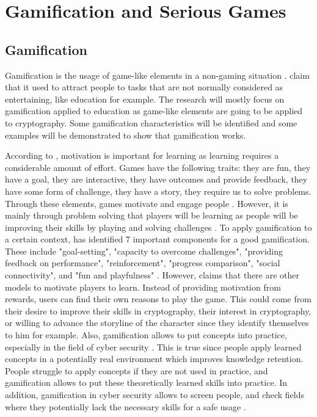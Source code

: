 \documentclass{l4proj}
\begin{document}
\section{Gamification and Serious Games}

\subsection{Gamification}
Gamification is the usage of game-like elements in a non-gaming situation \citep{aparicio_analysis_2012}.
\citet{aparicio_analysis_2012} claim that it used to attract people to tasks that are not normally considered as entertaining, like education for example.
The research will mostly focus on gamification applied to education as game-like elements are going to be applied to cryptography.
Some gamification characteristics will be identified and some examples will be demonstrated to show that gamification works.

According to \citet{hsiao_brief_2007}, motivation is important for learning as learning requires a considerable amount of effort. 
Games have the following traits: they are fun, they have a goal, they are interactive, they have outcomes and provide feedback, they have some form of challenge, 
they have a story, they require us to solve problems. Through these elements, games motivate and engage people \citep{hsiao_brief_2007}. 
However, it is mainly through problem solving that players will be learning as people will be improving their skills by playing and solving challenges \citep{hsiao_brief_2007}.
To apply gamification to a certain context, \citet{cugelman_gamification:_2013} has identified 7 important components for a good gamification. 
These include "goal-setting", "capacity to overcome challenges", "providing feedback on performance", "reinforcement", "progress comparison", "social connectivity", 
and "fun and playfulness" \citep{cugelman_gamification:_2013}. 
However, \citet{nicholson_recipe_2015} claims that there are other models to motivate players to learn. Instead of providing motivation from rewards, 
users can find their own reasons to play the game. This could come from their desire to improve their skills in cryptography, their interest in cryptography, or 
willing to advance the storyline of the character since they identify themselves to him for example.
Also, gamification allows to put concepts into practice, especially in the field of cyber security \citep{wolfenden_gamification_2019}. 
This is true since people apply learned concepts in a potentially real environment which improves knowledge retention. 
People struggle to apply concepts if they are not used in practice, and gamification allows to put these theoretically learned skills into practice.
In addition, gamification in cyber security allows to screen people,
and check fields where they potentially lack the necessary skills for a safe usage \citep{adams_cybersecurity_2015}.
\end{document}
